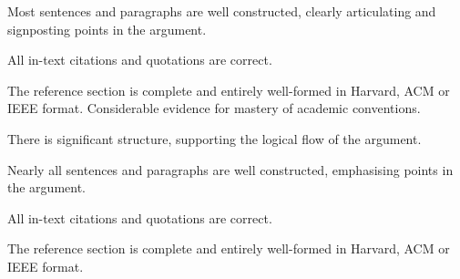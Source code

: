 \documentclass{../../fal_assignment}
\begin{document}
\begin{markingrubric}
            \par Most sentences and paragraphs are well constructed, clearly articulating and signposting points in the argument.
        \par All in-text citations and quotations are correct.
        \par The reference section is complete and entirely well-formed in Harvard, ACM or IEEE format.
        \grade 	Considerable evidence for mastery of academic conventions.
            \par There is significant structure, supporting the logical flow of the argument.
            \par Nearly all sentences and paragraphs are well constructed, emphasising points in the argument.
        \par All in-text citations and quotations are correct.
        \par The reference section is complete and entirely well-formed in Harvard, ACM or IEEE format.
\end{markingrubric}
\end{document}
